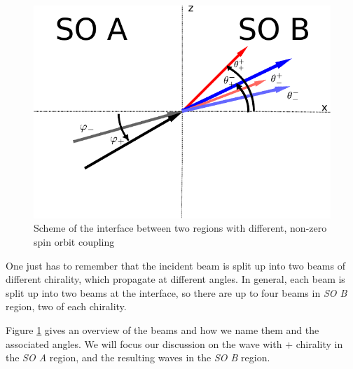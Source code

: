 \begin{figure}[htb]
    \begin{center}
        \includegraphics{setup-two-so-regions.pdf}
    \end{center}
    \caption{Scheme of the interface between two regions with
        different, non-zero spin orbit coupling}
    \label{fig:setup-nonzero}
\end{figure}

One just has to remember that the incident beam is split up
into two beams of different chirality, which propagate at different
angles. In general, each beam is split up into two beams at the
interface, so there are up to four beams in \emph{SO B} region,
two of each chirality.

Figure \ref{fig:setup-nonzero} gives an overview of the beams and how
we name them and the associated angles. We will focus our discussion
on the wave with $+$ chirality in the \emph{SO A} region, and the
resulting waves in the \emph{SO B} region.

